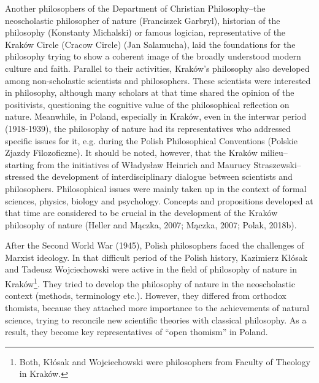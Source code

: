 \documentclass[a4paper]{article}
\begin{document}
Another philosophers of the Department of Christian Philosophy–the neoscholastic philosopher of nature (Franciszek
Garbryl), historian of the philosophy (Konstanty Michalski) or famous logician, representative of the Kraków Circle
(Cracow Circle) (Jan Salamucha), laid the foundations for the philosophy trying to show a coherent image of the broadly
understood modern culture and faith. Parallel to their activities, Kraków's philosophy also developed among
non-scholastic scientists and philosophers. These scientists were interested in philosophy, although many scholars at
that time shared the opinion of the positivists, questioning the cognitive value of the philosophical reflection on
nature. Meanwhile, in Poland, especially in Kraków, even in the interwar period (1918-1939), the philosophy of nature
had its representatives who addressed specific issues for it, e.g. during the Polish Philosophical Conventions (Polskie
Zjazdy Filozoficzne). It should be noted, however, that the Kraków milieu–starting from the initiatives of Władysław
Heinrich and Maurucy Straszewski–stressed the development of interdisciplinary dialogue between scientists and
philosophers. Philosophical issues were mainly taken up in the context of formal sciences, physics, biology and
psychology. Concepts and propositions developed at that time are considered to be crucial in the development of the
Kraków philosophy of nature \label{ref:RNDtc2qUrfP3e}(Heller and Mączka, 2007; Mączka, 2007; Polak, 2018b).

After the Second World War (1945), Polish philosophers faced the challenges of Marxist ideology. In that difficult
period of the Polish history, Kazimierz Kłósak and Tadeusz Wojciechowski were active in the field of philosophy of
nature in Kraków\footnote{ Both, Kłósak and Wojciechowski were philosophers from Faculty of Theology in Kraków. }. They
tried to develop the philosophy of nature in the neoscholastic context (methods, terminology etc.). However, they
differed from orthodox thomists, because they attached more importance to the achievements of natural science, trying
to reconcile new scientific theories with classical philosophy. As a result, they become key representatives of “open
thomism” in Poland.
\end{document}

